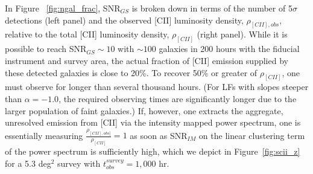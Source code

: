 \documentclass[12pt,preprint]{emulateapj}
\begin{document}

In Figure ~\ref{fig:ngal_frac}, SNR$_{GS}$  is broken down in terms of the number of 5$\sigma$ detections (left panel) and the observed [CII] luminosity density, $\rho_{[CII], obs}$, relative to the total [CII] luminosity density, $\rho_{[CII]}$ (right panel). While it is possible to reach SNR$_{GS} \sim 10$ with $\sim 100$ galaxies in 200 hours with the fiducial instrument and survey area, the actual fraction of [CII] emission supplied by these detected galaxies is close to 20\%. To recover 50\% or greater of $\rho_{[CII]}$, one must observe for longer than several thousand hours. (For LFs with slopes steeper than $\alpha = -1.0$, the required observing times are significantly longer due to the larger population of faint galaxies.) If, however, one extracts the aggregate, unresolved emission from [CII] via the intensity mapped power spectrum, one is essentially measuring $\frac{\rho_{[CII], obs]}}{\rho_{[CII]}} = 1$ as soon as SNR$_{IM}$ on the linear clustering term of the power spectrum is sufficiently high, which we depict in Figure~\ref{fig:scii_z} for a 5.3 deg$^2$ survey with $t_{obs}^{survey} = 1,000$ hr.
\end{document}

